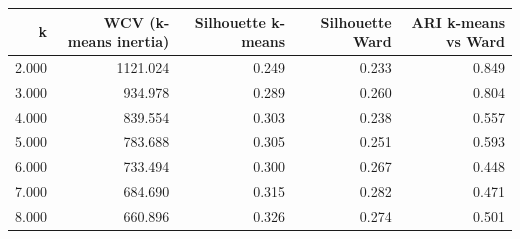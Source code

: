 \begin{tabular}{rrrrr}
\toprule
\textbf{k} & \textbf{WCV (k-means inertia)} & \textbf{Silhouette k-means} & \textbf{Silhouette Ward} & \textbf{ARI k-means vs Ward} \\
\midrule
2.000 & 1121.024 & 0.249 & 0.233 & 0.849 \\
3.000 & 934.978 & 0.289 & 0.260 & 0.804 \\
4.000 & 839.554 & 0.303 & 0.238 & 0.557 \\
5.000 & 783.688 & 0.305 & 0.251 & 0.593 \\
6.000 & 733.494 & 0.300 & 0.267 & 0.448 \\
7.000 & 684.690 & 0.315 & 0.282 & 0.471 \\
8.000 & 660.896 & 0.326 & 0.274 & 0.501 \\
\bottomrule
\end{tabular}

